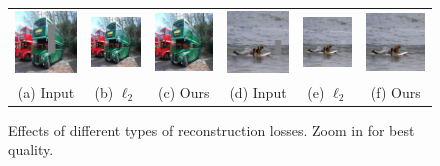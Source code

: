 \begin{figure}[h!]  
\centering  
\small  
\setlength\tabcolsep{1pt}
\begin{tabular}{cccccc} 
\includegraphics[width=.17\textwidth]{figures/loss/000000090208_input_image.jpg}& 
\includegraphics[width=.17\textwidth]{figures/loss/000000090208_synthesized_image.jpg}& 
\includegraphics[width=.17\textwidth]{figures/loss/000000090208_synthesized_image_final.jpg}& 
\includegraphics[width=.17\textwidth]{figures/loss/000000490171_input_image.jpg}& 
\includegraphics[width=.17\textwidth]{figures/loss/000000490171_synthesized_image.jpg}& 
\includegraphics[width=.17\textwidth]{figures/loss/000000490171_synthesized_image_final.jpg}\\
(a) Input & (b) $\ell_2$ & (c) Ours & (d) Input & (e) $\ell_2$ & (f) Ours\\ 
\end{tabular} 
\caption{Effects of different types of reconstruction losses. Zoom in for best quality.}
\label{fig:ppl} 
\end{figure}  


